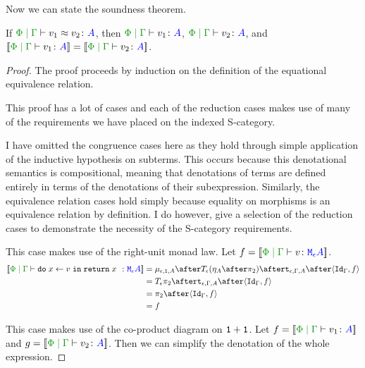 \documentclass{Report}
\begin{document}
Now we can state the soundness theorem. 


\begin{framed}
    \begin{theorem}[Soundness]\label{SOundness}
        If $\gpeberelation{v_1}{v_2}{A}$, then $\gpetyperelation{v_1}{A}$, $\gpetyperelation{v_2}{A}$, and $\deno{\gpetyperelation{v_1}{A}} = \deno{\gpetyperelation{v_2}{A}}$.
    \end{theorem}
    
    
    \begin{proof}
        The proof proceeds by induction on the definition of the equational equivalence relation.
    
        This proof has a lot of cases and each of the reduction cases makes use of many of the requirements we have placed on the indexed S-category.
    
        I have omitted the congruence cases here as they hold through simple application of the inductive hypothesis on subterms. This occurs because this denotational semantics is compositional, meaning that denotations of terms are defined entirely in terms of the denotations of their subexpression. Similarly, the equivalence relation cases hold simply because equality on morphisms is an equivalence relation by definition. I do however, give a selection of the reduction cases to demonstrate the necessity of the S-category requirements.
    
    \case{\eqrightunit}
    This case makes use of the right-unit monad law. Let $f = \deno{\gpetyperelation{v}{\mea}}$.
        \begin{equation}
        \begin{split}
            \deno{\gpetyperelation{\doin{x}{v}{\return{x}}}{\mea}}  & = \bind{\e}{\1}{A} \after \T{\e}{(\point{A} \after \pp)} \after \tstrength{\e}{\G}{A}\after \pr{\idg}{f} \\
            & = \T{\e}{\pp} \after \tstrength{\e}{\G}{A} \after \pr {\idg}{f} \\
            & = \pp \after \pr{\idg}{f}\\
            & = f
        \end{split}
    \end{equation}
    
    \case{\eqiftrue}
    This case makes use of the co-product diagram on $\texttt{1} + \texttt{1}$. Let $f = \deno{\gpetyperelation{v_1}{A}}$  and  $g = \deno{\gpetyperelation{v_2}{A}}$. Then we can simplify the denotation of the whole expression.
    

\end{proof}
\end{framed}
\end{document}
